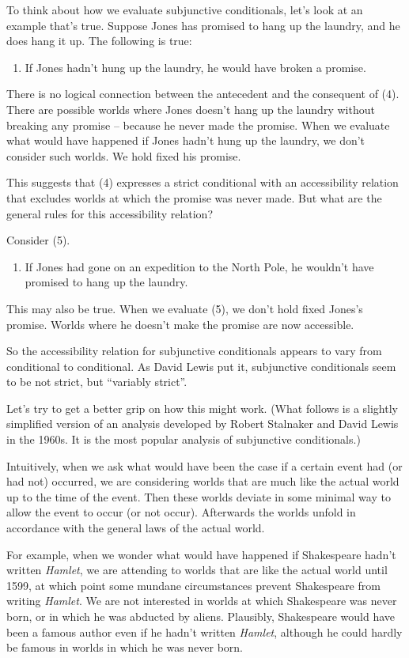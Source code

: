 To think about how we evaluate subjunctive conditionals, let's look at an example that's true.
Suppose Jones has promised to hang up the laundry,
and he does hang it up.
The following is true:
\begin{enumerate}[leftmargin=10mm]
  \item[(4)] If Jones hadn't hung up the laundry, he would have broken a promise.
\end{enumerate}
There is no logical connection between the antecedent and the consequent of (4).
There are possible worlds where Jones doesn't hang up the laundry without
breaking any promise -- because he never made the promise. When we evaluate what
would have happened if Jones hadn't hung up the laundry, we don't consider such
worlds. We hold fixed his promise.

This suggests that (4) expresses a strict conditional with an accessibility
relation that excludes worlds at which the promise was never made. But what are
the general rules for this accessibility relation?

Consider (5).
\begin{enumerate}[leftmargin=10mm]
  \item[(5)] If Jones had gone on an expedition to the North Pole, he wouldn't have promised to hang up the laundry.
\end{enumerate}
This may also be true. When we evaluate (5), we don't hold fixed Jones's
promise. Worlds where he doesn't make the promise are now accessible.

So the accessibility relation for subjunctive conditionals appears to vary from
conditional to conditional. As David Lewis put it, subjunctive conditionals seem
to be not strict, but ``variably strict''.

Let's try to get a better grip on how this might work. (What follows is a
slightly simplified version of an analysis developed by Robert Stalnaker and
David Lewis in the 1960s. It is the most popular analysis of subjunctive conditionals.)

Intuitively, when we ask what would have been the case if a certain event had
(or had not) occurred, we are considering worlds that are much like the actual
world up to the time of the event. Then these worlds deviate in some minimal way
to allow the event to occur (or not occur). Afterwards the worlds unfold in
accordance with the general laws of the actual world.

For example, when we wonder what would have happened if Shakespeare hadn't
written \emph{Hamlet}, we are attending to worlds that are like the actual world
until 1599, at which point some mundane circumstances prevent Shakespeare from
writing \emph{Hamlet}. We are not interested in worlds at which Shakespeare was
never born, or in which he was abducted by aliens. Plausibly, Shakespeare would
have been a famous author even if he hadn't written \emph{Hamlet}, although he
could hardly be famous in worlds in which he was never born.

